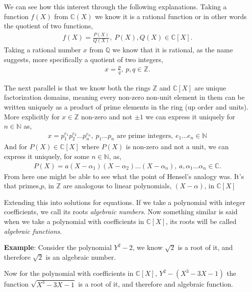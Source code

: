 \documentclass[12pt]{article}
\theoremstyle{definition}
\theoremstyle{remark}
\newcommand{\zz}{\mathbb Z}   %
\newcommand{\qq}{\mathbb Q}   %
\newcommand{\nn}{\mathbb N}   %
\newcommand{\cc}{\mathbb C}   %
\begin{document}
We can see how this interest through the following explanations. Taking a function $f(X)$ from $\cc(X)$ we know it is a rational function or in other words the quotient of two functions,
\begin{align*}
  f(X) = \frac{P(X)}{Q(X)}, \ P(X),Q(X) \in \cc[X].
\end{align*}
Taking a rational number $x$ from $\qq$ we know that it is rational, as the name suggests, more specifically a quotient of two integers,
\begin{align*}
  x = \frac{p}{q}, \ p,q \in \zz.
\end{align*}

The next parallel is that we know both the rings $\zz$ and $\cc[X]$ are unique factorization domains, meaning every non-zero non-unit element in them can be written uniquely as a product of prime elements in the ring (up order and units). More explicitly for $x \in \zz$ non-zero and not $\pm 1$ we can express it uniquely for $n \in \nn$ as,
\begin{align*}
  x = p_1^{e_1} p_2^{e_2}\dots p_n^{e_n}, \ p_1\dots p_n \text{  are prime integers}, \ e_1\dots e_n \in \nn
\end{align*}
And for $P(X) \in \cc[X]$ where $P(X)$ is non-zero and not a unit, we can express it uniquely, for some $n \in \nn$, as,
\begin{align*}
  P(X) = a(X - \alpha_1)(X-\alpha_2)\dots (X - \alpha_n), \ a,\alpha_1\dots\alpha_n \in \cc.
\end{align*}
From here one might be able to see what the point of Hensel's analogy was. It's that primes,$p$, in $\zz$ are analogous to linear polynomials, $(X-\alpha)$, in $\cc[X]$

Extending this into solutions for equations. If we take a polynomial with integer coefficients, we call its roots \textit{algebraic numbers}. Now something similar is said when we take a polynomial with coefficients in $\cc[X]$, its roots will be called \textit{algebraic functions}.

\textbf{Example}: Consider the polynomial $Y^{2}-2$, we know $\sqrt{2}$ is a root of it, and therefore $\sqrt{2}$ is an algebraic number. 

Now for the polynomial with coefficients in $\cc[X]$, $Y^{2} - (X^{3}-3X - 1)$ the function $\sqrt{X^{3}-3X -1}$ is a root of it, and therefore and algebraic function. 
\end{document}
